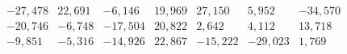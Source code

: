 \[
\begin{array}{rrrrrrr}
-27,478 & 22,691 & -6,146 & 19,969 & 27,150 & 5,952 & -34,570 \\ 
-20,746 & -6,748 & -17,504 & 20,822 & 2,642 & 4,112 & 13,718 \\ 
-9,851 & -5,316 & -14,926 & 22,867 & -15,222 & -29,023 & 1,769
\end{array}
\]
